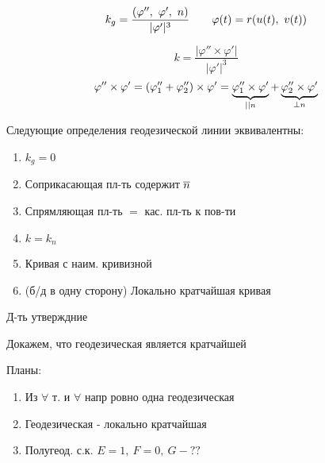 \documentclass[main]{subfiles}
\begin{document}
    \begin{Utv}[формула]
        \[k_g = \frac{(\varphi'',\ \varphi',\ n)}{|\varphi'|^3} \qq \varphi(t) = r(u(t),\ v(t))\]
    \end{Utv}

    \begin{Proof}
        \[k = \frac{|\varphi'' \times \varphi'|}{|\varphi'|^3}\]
        \[\varphi'' \times \varphi' = (\varphi''_1 + \varphi''_2) \times \varphi' = \ub{||n}{\varphi''_1 \times \varphi'} + \ub{\bot n}{\varphi''_2 \times \varphi'}\]
    \end{Proof}

    \begin{utv}
        Следующие определения геодезической линии эквивалентны:
        \begin{enumerate}
          \item $k_g = 0$
          \item Соприкасающая пл-ть содержит $\ol{n}$
          \item Спрямляющая пл-ть $=$ кас. пл-ть к пов-ти
          \item $k = k_n$
          \item Кривая с наим. кривизной
          \item (б/д в одну сторону) Локально кратчайшая кривая
        \end{enumerate}
    \end{utv}

    \begin{upr}
        Д-ть утверждние

        Докажем, что геодезическая является кратчайшей
    \end{upr}

    Планы:
    \begin{enumerate}
      \item Из $\forall$ т. и $\forall$ напр ровно одна геодезическая
      \item Геодезическая - локально кратчайшая
      \item Полугеод. с.к. $E=1,\ F = 0,\ G -??$
    \end{enumerate}
\end{document}
